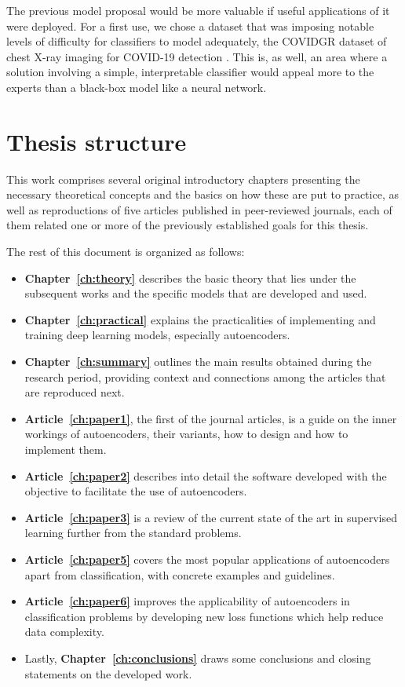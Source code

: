 The previous model proposal would be more valuable if useful applications of it were deployed. For a first use, we chose a dataset that was imposing notable levels of difficulty for classifiers to model adequately, the COVIDGR dataset of chest X-ray imaging for COVID-19 detection . This is, as well, an area where a solution involving a simple, interpretable classifier would appeal more to the experts than a black-box model like a neural network.

\section{Thesis structure}

This work comprises several original introductory chapters presenting the necessary theoretical concepts and the basics on how these are put to practice, as well as reproductions of five articles published in peer-reviewed journals, each of them related one or more of the previously established goals for this thesis.

The rest of this document is organized as follows: %

\begin{itemize}
    \item \textbf{Chapter~\ref{ch:theory}} describes the basic theory that lies under the subsequent works and the specific models that are developed and used.
    \item \textbf{Chapter~\ref{ch:practical}} explains the practicalities of implementing and training deep learning models, especially autoencoders.
    \item \textbf{Chapter~\ref{ch:summary}} outlines the main results obtained during the research period, providing context and connections among the articles that are reproduced next.
    \item \textbf{Article~\ref{ch:paper1}}, the first of the journal articles, is a guide on the inner workings of autoencoders, their variants, how to design and how to implement them.
    \item \textbf{Article~\ref{ch:paper2}} describes into detail the software developed with the objective to facilitate the use of autoencoders.
    \item \textbf{Article~\ref{ch:paper3}} is a review of the current state of the art in supervised learning further from the standard problems.
    \item \textbf{Article~\ref{ch:paper5}} covers the most popular applications of autoencoders apart from classification, with concrete examples and guidelines.
    \item \textbf{Article~\ref{ch:paper6}} improves the applicability of autoencoders in classification problems by developing new loss functions which help reduce data complexity.
    \item Lastly, \textbf{Chapter~\ref{ch:conclusions}} draws some conclusions and closing statements on the developed work.
\end{itemize}